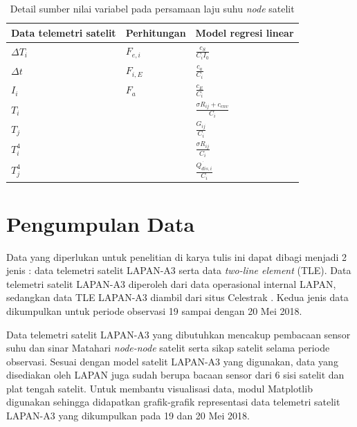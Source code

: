 \begin{table}[!ht]
\begin{center}
	\caption{Detail sumber nilai variabel pada persamaan laju suhu \textit{node} satelit}
\label{table:variabellist}
\begin{tabular}{|l|l|l|}
\hline
Data telemetri satelit & Perhitungan & Model regresi linear                  \\ \hline
$\Delta T_{i}$         & $F_{e,i}$   & $\frac{c_S}{C_iI_0}$                  \\ \hline
$\Delta t$             & $F_{i,E}$   & $\frac{c_a}{C_i}$                     \\ \hline
$I_i$                  & $F_{a}$     & $\frac{c_E}{C_i}$                     \\ \hline
$T_i$                  &             & $\frac{\sigma R_{ij} + c_{env}}{C_i}$ \\ \hline
$T_j$                  &             & $\frac{G_{ij}}{C_i}$                  \\ \hline
$T_i^4$             &             & $\frac{\sigma R_{ij}}{C_i}$           \\ \hline
$T_j^4$             &             & $\frac{\dot{Q_{dis,i}}}{C_i}$         \\ \hline
\end{tabular}
\end{center}
\vspace{-5mm}
\end{table}


\section{Pengumpulan Data}

Data yang diperlukan untuk penelitian di karya tulis ini dapat dibagi menjadi 2 jenis : data
telemetri satelit LAPAN-A3 serta data \textit{two-line element} (TLE). Data
telemetri satelit LAPAN-A3 diperoleh dari data operasional internal LAPAN,
sedangkan data TLE LAPAN-A3 diambil dari situs Celestrak \cite{kelso}. Kedua
jenis data dikumpulkan untuk periode observasi 19 sampai dengan 20 Mei 2018.

Data telemetri satelit LAPAN-A3 yang dibutuhkan mencakup pembacaan sensor suhu
dan sinar Matahari \textit{node-node} satelit serta sikap satelit selama
periode observasi. Sesuai dengan model satelit LAPAN-A3 yang digunakan, data
yang disediakan oleh LAPAN juga sudah berupa bacaan sensor dari 6 sisi satelit
dan plat tengah satelit. Untuk membantu visualisasi data, modul Matplotlib
digunakan sehingga didapatkan grafik-grafik representasi data telemetri satelit
LAPAN-A3 yang dikumpulkan pada 19 dan 20 Mei 2018.

